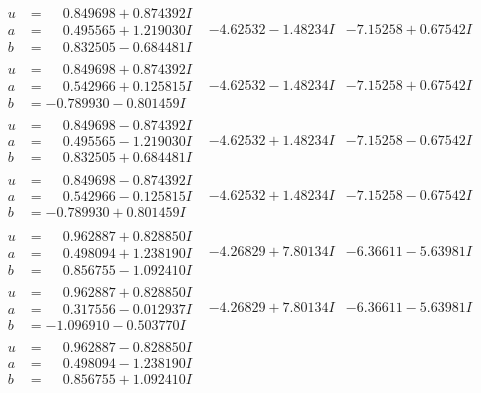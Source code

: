 \documentclass[1p]{elsarticle_modified}
\theoremstyle{definition}
\begin{document}
$$\begin{array}{c|c|c}
\begin{aligned}
u &= \phantom{-}0.849698 + 0.874392 I \\
a &= \phantom{-}0.495565 + 1.219030 I \\
b &= \phantom{-}0.832505 - 0.684481 I\end{aligned}
 & -4.62532 - 1.48234 I & -7.15258 + 0.67542 I \\ \hline\begin{aligned}
u &= \phantom{-}0.849698 + 0.874392 I \\
a &= \phantom{-}0.542966 + 0.125815 I \\
b &= -0.789930 - 0.801459 I\end{aligned}
 & -4.62532 - 1.48234 I & -7.15258 + 0.67542 I \\ \hline\begin{aligned}
u &= \phantom{-}0.849698 - 0.874392 I \\
a &= \phantom{-}0.495565 - 1.219030 I \\
b &= \phantom{-}0.832505 + 0.684481 I\end{aligned}
 & -4.62532 + 1.48234 I & -7.15258 - 0.67542 I \\ \hline\begin{aligned}
u &= \phantom{-}0.849698 - 0.874392 I \\
a &= \phantom{-}0.542966 - 0.125815 I \\
b &= -0.789930 + 0.801459 I\end{aligned}
 & -4.62532 + 1.48234 I & -7.15258 - 0.67542 I \\ \hline\begin{aligned}
u &= \phantom{-}0.962887 + 0.828850 I \\
a &= \phantom{-}0.498094 + 1.238190 I \\
b &= \phantom{-}0.856755 - 1.092410 I\end{aligned}
 & -4.26829 + 7.80134 I & -6.36611 - 5.63981 I \\ \hline\begin{aligned}
u &= \phantom{-}0.962887 + 0.828850 I \\
a &= \phantom{-}0.317556 - 0.012937 I \\
b &= -1.096910 - 0.503770 I\end{aligned}
 & -4.26829 + 7.80134 I & -6.36611 - 5.63981 I \\ \hline\begin{aligned}
u &= \phantom{-}0.962887 - 0.828850 I \\
a &= \phantom{-}0.498094 - 1.238190 I \\
b &= \phantom{-}0.856755 + 1.092410 I\end{aligned}

\end{array}$$
\end{document}

